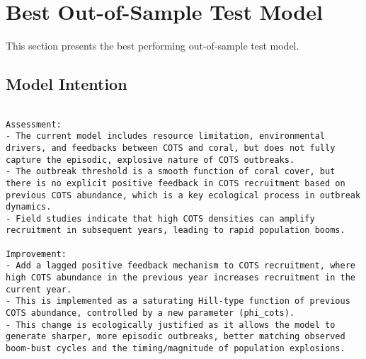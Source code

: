 \section{Best Out-of-Sample Test Model}
\label{sec:best_out_of_sample}
This section presents the best performing out-of-sample test model.

\subsection{Model Intention}
\begin{lstlisting}

Assessment:
- The current model includes resource limitation, environmental drivers, and feedbacks between COTS and coral, but does not fully capture the episodic, explosive nature of COTS outbreaks.
- The outbreak threshold is a smooth function of coral cover, but there is no explicit positive feedback in COTS recruitment based on previous COTS abundance, which is a key ecological process in outbreak dynamics.
- Field studies indicate that high COTS densities can amplify recruitment in subsequent years, leading to rapid population booms.

Improvement:
- Add a lagged positive feedback mechanism to COTS recruitment, where high COTS abundance in the previous year increases recruitment in the current year.
- This is implemented as a saturating Hill-type function of previous COTS abundance, controlled by a new parameter (phi_cots).
- This change is ecologically justified as it allows the model to generate sharper, more episodic outbreaks, better matching observed boom-bust cycles and the timing/magnitude of population explosions.
\end{lstlisting}

